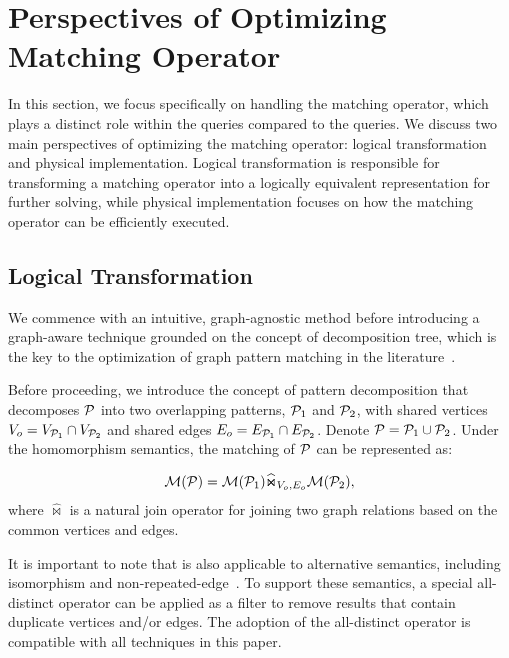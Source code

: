 
\section{Perspectives of Optimizing Matching Operator}
In this section, we focus specifically on handling the matching operator, which plays a distinct role
within the \spjm queries compared to the \spj queries. We discuss two main perspectives of optimizing
the matching operator: logical transformation and physical implementation. Logical transformation is
responsible for transforming a matching operator into a logically equivalent representation for further solving,
while physical implementation focuses on how the matching operator can be efficiently executed.

\subsection{Logical Transformation}
\label{sec:handling-match-operator}
We commence with an intuitive, graph-agnostic method before
introducing a graph-aware technique grounded on the concept of decomposition tree, which
is the key to the optimization of graph pattern matching in the literature~\cite{huge,GLogS}.

Before proceeding, we introduce the concept of pattern decomposition that decomposes $\mathcal{P}$ into two overlapping patterns, $\mathcal{P}_1$ and $\mathcal{P}_2$, with shared vertices $V_{o} = V_{\mathcal{P}_1} \cap V_{\mathcal{P}_2}$ and shared edges $E_{o} = E_{\mathcal{P}_1} \cap E_{\mathcal{P}_2}$.
Denote $\mathcal{P} = \mathcal{P}_1 \cup \mathcal{P}_2$. Under the homomorphism semantics, the matching of $\mathcal{P}$ can be represented as:

\begin{equation}
    \label{eq:join-pattern}
    \mathcal{M}(\mathcal{P}) = \mathcal{M}(\mathcal{P}_1) \widehat{\Join}_{V_{o}, E_{o}} \mathcal{M}(\mathcal{P}_2),
\end{equation}
where $\widehat{\Join}$ is a natural join operator for joining two graph relations based on the common vertices and edges.

It is important to note that  is also applicable to alternative semantics, including isomorphism and non-repeated-edge~\cite{angles2017foundations}. To support these semantics, a special all-distinct operator can be applied as a filter to remove results that contain duplicate vertices and/or edges. The adoption of the all-distinct operator is compatible with all techniques in this paper.


